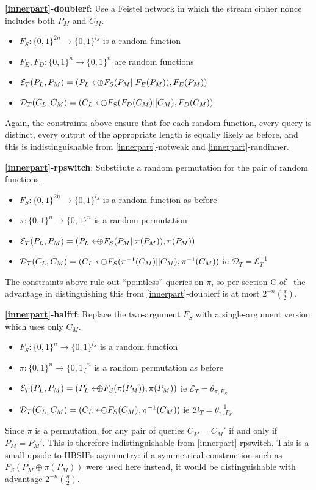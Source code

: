 \documentclass[journal=tosc,preprint,floatrow,submission]{iacrtrans}
\newcommand*{\arrowoplus}{\leftarrow\mkern-12mu\oplus}
\newcommand*{\xprm}[2]{\textsf{\ref*{#1}-#2}}
\newcommand*{\xprmtitle}[2]{\textbf{\xprm{#1}{#2}}}
\newcommand*{\calE}{\mathcal{E}}
\newcommand*{\calD}{\mathcal{D}}
\begin{document}
\xprmtitle{innerpart}{doublerf}: Use a Feistel network in which the stream cipher
nonce includes both $P_M$ and $C_M$.
\begin{itemize}
    \item $F_S: \{0,1\}^{2n} \rightarrow \{0,1\}^{l_S}$ is a random
    function
    \item $F_E, F_D: \{0,1\}^n \rightarrow \{0,1\}^n$ are random functions
    \item $\calE_T(P_L, P_M) = (P_L \arrowoplus F_S(P_M || F_E(P_M)), F_E(P_M))$
    \item $\calD_T(C_L, C_M) = (C_L \arrowoplus F_S(F_D(C_M) || C_M), F_D(C_M))$
\end{itemize}
Again, the constraints above ensure that for each random function,
every query is distinct,
every output of the appropriate length is equally
likely as before, and this is indistinguishable from
\xprm{innerpart}{notweak} and \xprm{innerpart}{randinner}.

\xprmtitle{innerpart}{rpswitch}: Substitute a random permutation for the pair of random functions.
\begin{itemize}
    \item $F_S: \{0,1\}^{2n} \rightarrow \{0,1\}^{l_S}$ is a random function as before
    \item $\pi: \{0,1\}^n \rightarrow \{0,1\}^n$ is a random permutation
    \item $\calE_T(P_L, P_M) = (P_L \arrowoplus F_S(P_M || \pi(P_M)), \pi(P_M))$
    \item $\calD_T(C_L, C_M) = (C_L \arrowoplus F_S(\pi^{-1}(C_M) || C_M), \pi^{-1}(C_M))$
    ie $\calD_T = \calE_T^{-1}$
\end{itemize}
The constraints above rule out ``pointless'' queries on $\pi$, so per section C of~\cite{cmc}
the advantage in distinguishing this from \xprm{innerpart}{doublerf} is at most
$2^{-n}\binom{q}{2}$.

\xprmtitle{innerpart}{halfrf}: Replace the two-argument $F_S$ with
a single-argument version which uses only $C_M$.
\begin{itemize}
    \item $F_S: \{0,1\}^n \rightarrow \{0,1\}^{l_S}$ is a random function
    \item $\pi: \{0,1\}^n \rightarrow \{0,1\}^n$ is a random permutation as before
    \item $\calE_T(P_L, P_M) = (P_L \arrowoplus F_S(\pi(P_M)), \pi(P_M))$
    ie $\calE_T = \theta_{\pi, F_S}$
    \item $\calD_T(C_L, C_M) = (C_L \arrowoplus F_S(C_M), \pi^{-1}(C_M))$
    ie $\calD_T = \theta_{\pi, F_S}^{-1}$
\end{itemize}
Since $\pi$ is a permutation,
for any pair of queries $C_M = C_M'$ if and only if $P_M = P_M'$.
This is therefore indistinguishable from \xprm{innerpart}{rpswitch}.
This is a small upside to HBSH's asymmetry: if a symmetrical
construction such as $F_S(P_M \oplus \pi(P_M))$ were used here instead, it would be
distinguishable with advantage $2^{-n}\binom{q}{2}$.
\end{document}
